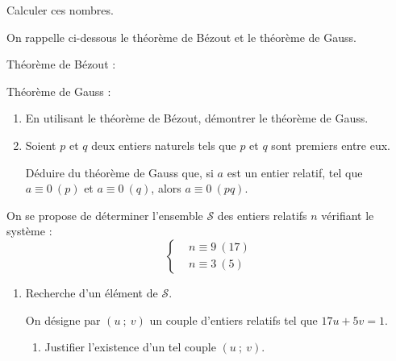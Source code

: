 \begin{colonne*exercice}
\begin{exercice}
\begin{enumerate}
Calculer ces nombres.
\end{enumerate}
\end{exercice}


\begin{exercice}


On rappelle ci-dessous le théorème de Bézout et le théorème de Gauss.

Théorème de Bézout :


Théorème de Gauss :


\begin{enumerate}
\item En utilisant le théorème de Bézout, démontrer le théorème de Gauss.

\item Soient $p$ et $q$ deux entiers naturels tels que $p$ et $q$ sont premiers entre eux.

Déduire du théorème de Gauss que, si $a$ est un entier relatif, tel que $a\equiv0~(p)$ et $a\equiv0~(q)$, alors $a\equiv0~(pq)$.
\end{enumerate}\medskip

\partie{}

On se propose de déterminer l'ensemble $\mathscr{S}$ des entiers relatifs $n$ vérifiant le système :
$$\left\{\begin{aligned}
				&n\equiv9~(17)\\
				&n\equiv3~(5)\end{aligned}\right.$$
\begin{enumerate}			
\item Recherche d'un élément de $\mathscr{S}$.

On désigne par $(u\ ;\ v)$ un couple d'entiers relatifs tel que $17u+5v=1$.
\begin{enumerate}
\item Justifier l'existence d'un tel couple $(u\ ;\ v)$.


\end{enumerate}
\end{enumerate}
\end{exercice}
\end{colonne*exercice}
